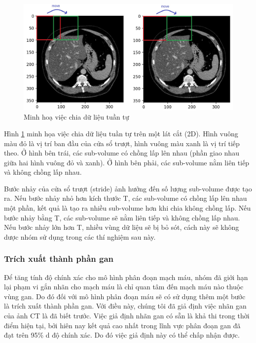 \begin{figure}[H]
    \centering
    \includegraphics[width=12cm]{images/dataset/sub-volume-2d.jpg}
    \caption{Minh hoạ việc chia dữ liệu tuần tự}
    \label{2d_subvolume}
\end{figure} \par
Hình \ref{2d_subvolume} minh họa việc chia dữ liệu tuần tự trên một lát cắt (2D). Hình vuông màu đỏ là vị trí ban đầu của cửa sổ trượt, hình vuông màu xanh là vị trí tiếp theo. Ở hình bên trái, các sub-volume có chồng lấp lên nhau (phần giao nhau giữa hai hình vuông đỏ và xanh). Ở hình bên phải, các sub-volume nằm liên tiếp và không chồng lấp nhau. \par
Bước nhảy của cửa sổ trượt (stride) ảnh hưởng đến số lượng sub-volume được tạo ra. Nếu bước nhảy nhỏ hơn kích thước T, các sub-volume có chồng lấp lên nhau một phần, kết quả là tạo ra nhiều sub-volume hơn khi chia không chồng lấp. Nếu bước nhảy bằng T, các sub-volume sẽ nằm liên tiếp và không chồng lấp nhau. Nếu bước nhảy lớn hơn T, nhiều vùng dữ liệu sẽ bị bỏ sót, cách này sẽ không dược nhóm sử dụng trong các thí nghiệm sau này.

\subsubsection{Trích xuất thành phần gan}
Để tăng tính độ chính xác cho mô hình phân đoạn mạch máu, nhóm đã giới hạn lại phạm vi gắn nhãn cho mạch máu là chỉ quan tâm đến mạch máu nào thuộc vùng gan. Do đó đối với mô hình phân đoạn máu sẽ có sử dụng thêm một bước là trích xuất thành phần gan. Với điều này, chúng tôi đã giả định việc nhãn gan của ảnh CT là đã biết trước. Việc giả định nhãn gan có sẵn là khả thi trong thời điểm hiện tại, bởi hiên nay kết quả cao nhất trong lĩnh vực phân đoạn gan đã đạt trên 95\% d
độ chính xác. Do đó việc giả định này có thể chấp nhận được.

